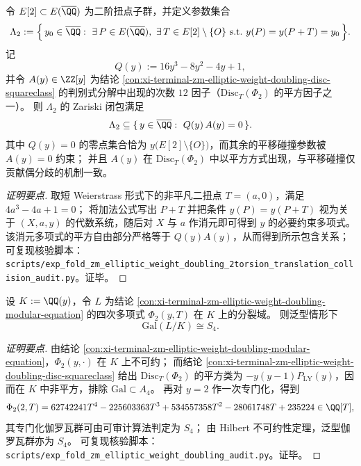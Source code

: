 \begin{conclusion}\label{con:xi-terminal-zm-elliptic-weight-doubling-2torsion-translation-collision-parameters}
令 \(E[2]\subset E(\overline{\QQ})\) 为二阶扭点子群，并定义参数集合
\[
\Lambda_{2}:=\Bigl\{\,y_{0}\in\overline{\QQ}:\ \exists\,P\in E(\overline{\QQ}),\ \exists\,T\in E[2]\setminus\{O\}\ \text{s.t.}\ y(P)=y(P+T)=y_{0}\,\Bigr\}.
\]
记
\[
Q(y):=16y^{3}-8y^{2}-4y+1,
\]
并令 \(A(y)\in\ZZ[y]\) 为结论 \ref{con:xi-terminal-zm-elliptic-weight-doubling-disc-squareclass} 的判别式分解中出现的次数 \(12\) 因子（\(\mathrm{Disc}_{T}(\Phi_{2})\) 的平方因子之一）。
则 \(\Lambda_{2}\) 的 Zariski 闭包满足
\[
\Lambda_{2}\subseteq \{\,y\in\overline{\QQ}:\ Q(y)\,A(y)=0\,\}.
\]
其中 \(Q(y)=0\) 的零点集合恰为 \(y\bigl(E[2]\setminus\{O\}\bigr)\)，而其余的平移碰撞参数被 \(A(y)=0\) 约束；
并且 \(A(y)\) 在 \(\mathrm{Disc}_{T}(\Phi_{2})\) 中以平方方式出现，与平移碰撞仅贡献偶分歧的机制一致。
\end{conclusion}
\begin{proof}[证明要点]
取短 Weierstrass 形式下的非平凡二扭点 \(T=(a,0)\)，满足 \(4a^{3}-4a+1=0\)；
将加法公式写出 \(P+T\) 并把条件 \(y(P)=y(P+T)\) 视为关于 \((X,a,y)\) 的代数系统，随后对 \(X\) 与 \(a\) 作消元即可得到 \(y\) 的必要约束多项式。
该消元多项式的平方自由部分严格等于 \(Q(y)A(y)\)，从而得到所示包含关系；可复现核验脚本：\texttt{scripts/exp\_fold\_zm\_elliptic\_weight\_doubling\_2torsion\_translation\_collision\_audit.py}。证毕。
\end{proof}

\begin{conclusion}\label{con:xi-terminal-zm-elliptic-weight-doubling-galois-s4}
设 \(K:=\QQ(y)\)，令 \(L\) 为结论 \ref{con:xi-terminal-zm-elliptic-weight-doubling-modular-equation} 的四次多项式 \(\Phi_{2}(y,T)\) 在 \(K\) 上的分裂域。
则泛型情形下
\[
\mathrm{Gal}(L/K)\cong S_{4}.
\]
\end{conclusion}
\begin{proof}[证明要点]
由结论 \ref{con:xi-terminal-zm-elliptic-weight-doubling-modular-equation}，\(\Phi_{2}(y,\cdot)\) 在 \(K\) 上不可约；
而结论 \ref{con:xi-terminal-zm-elliptic-weight-doubling-disc-squareclass} 给出 \(\mathrm{Disc}_{T}(\Phi_{2})\) 的平方类为 \(-y(y-1)P_{\mathrm{LY}}(y)\)，因而在 \(K\) 中非平方，排除 \(\mathrm{Gal}\subset A_{4}\)。
再对 \(y=2\) 作一次专门化，得到
\[
\Phi_{2}(2,T)=62742241T^{4}-225603363T^{3}+534557358T^{2}-28061748T+235224\in\QQ[T],
\]
其专门化伽罗瓦群可由可审计算法判定为 \(S_{4}\)；
由 Hilbert 不可约性定理，泛型伽罗瓦群亦为 \(S_{4}\)。
可复现核验脚本：\texttt{scripts/exp\_fold\_zm\_elliptic\_weight\_doubling\_audit.py}。证毕。
\end{proof}

